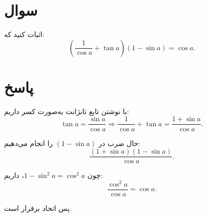 \documentclass{article}
\begin{document}
\section{سوال}

اثبات کنید که:
\begin{equation}
    \left(\frac{1}{\cos a} + \tan a\right)(1 - \sin a) = \cos a.
\end{equation}

\section{پاسخ}


با نوشتن تابع تانژانت به‌صورت کسر داریم:
\begin{equation}
    \tan a = \frac{\sin a}{\cos a} \Rightarrow \frac{1}{\cos a} + \tan a = \frac{1 + \sin a}{\cos a}.
\end{equation}

حال ضرب در $(1 - \sin a)$ را انجام می‌دهیم:
\begin{equation}
    \frac{(1 + \sin a)(1 - \sin a)}{\cos a}.
\end{equation}

چون $1 - \sin^2 a = \cos^2 a$، داریم:
\begin{equation}
    \frac{\cos^2 a}{\cos a} = \cos a.
\end{equation}

پس اتحاد برقرار است.
\end{document}

